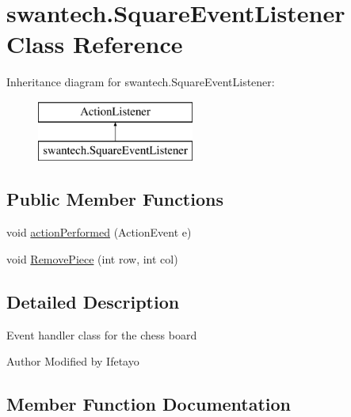 \hypertarget{classswantech_1_1_square_event_listener}{}\section{swantech.\+Square\+Event\+Listener Class Reference}
\label{classswantech_1_1_square_event_listener}
Inheritance diagram for swantech.\+Square\+Event\+Listener\+:\begin{figure}[H]
\begin{center}
\leavevmode
\includegraphics[height=2.000000cm]{classswantech_1_1_square_event_listener}
\end{center}
\end{figure}
\subsection*{Public Member Functions}
\begin{DoxyCompactItemize}
\item 
void \hyperlink{classswantech_1_1_square_event_listener_a5727ee3cd7853e04b1407ead3b1ad73d}{action\+Performed} (Action\+Event e)
\item 
void \hyperlink{classswantech_1_1_square_event_listener_a20ec344e232ddf50aaf2ecac0d26587e}{Remove\+Piece} (int row, int col)
\end{DoxyCompactItemize}


\subsection{Detailed Description}
Event handler class for the chess board \begin{DoxyAuthor}{Author}
Modified by Ifetayo 
\end{DoxyAuthor}


\subsection{Member Function Documentation}
\hypertarget{classswantech_1_1_square_event_listener_a5727ee3cd7853e04b1407ead3b1ad73d}{}
